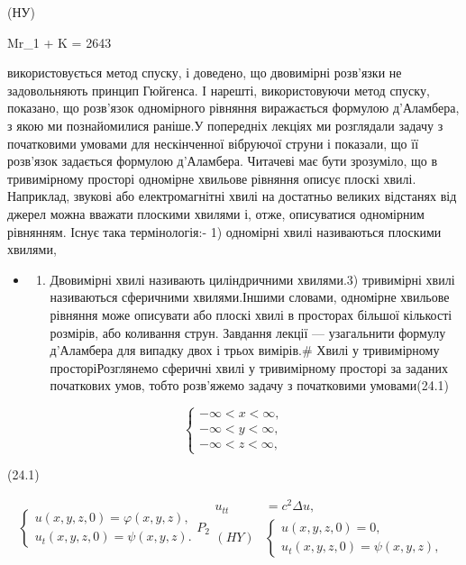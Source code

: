 \documentclass[
  ukrainian,
]{article}
\providecommand{\tightlist}{%
  \setlength{\itemsep}{0pt}\setlength{\parskip}{0pt}}
\begin{document}
(НУ)

Mr\_1 + K = 2643

використовується метод спуску, і доведено, що двовимірні розв'язки не
задовольняють принцип Гюйгенса. І нарешті, використовуючи метод спуску,
показано, що розв'язок одномірного рівняння виражається формулою
д'Аламбера, з якою ми познайомилися раніше.У попередніх лекціях ми
розглядали задачу з початковими умовами для нескінченної вібруючої
струни і показали, що її розв'язок задається формулою д'Аламбера.
Читачеві має бути зрозуміло, що в тривимірному просторі одномірне
хвильове рівняння описує плоскі хвилі. Наприклад, звукові або
електромагнітні хвилі на достатньо великих відстанях від джерел можна
вважати плоскими хвилями і, отже, описуватися одномірним рівнянням.
Існує така термінологія:- 1) одномірні хвилі називаються плоскими
хвилями,

\begin{itemize}
\tightlist
\item
  \begin{enumerate}
  \def\labelenumi{\arabic{enumi})}
  \setcounter{enumi}{1}
  \tightlist
  \item
    Двовимірні хвилі називають циліндричними хвилями.3) тривимірні хвилі
    називаються сферичними хвилями.Іншими словами, одномірне хвильове
    рівняння може описувати або плоскі хвилі в просторах більшої
    кількості розмірів, або коливання струн. Завдання лекції ---
    узагальнити формулу д'Аламбера для випадку двох і трьох вимірів.\#
    Хвилі у тривимірному просторіРозглянемо сферичні хвилі у
    тривимірному просторі за заданих початкових умов, тобто розв'яжемо
    задачу з початковими умовами(24.1)
  \end{enumerate}
\end{itemize}

\[
\begin{cases} -\infty < x < \infty, \\ -\infty < y < \infty, \\ -\infty < z < \infty, \end{cases}
\]

(24.1)

\[
\begin{cases} u(x, y, z, 0) = \varphi(x, y, z), \\ u_{t}(x, y, z, 0) = \psi(x, y, z). \end{cases}
P_{2}
\begin{aligned} u_{tt} &= c^2 \Delta u, \\ (HY) & \begin{cases} u(x, y, z, 0) = 0, \\ u_t(x, y, z, 0) = \psi(x, y, z), \end{cases} \end{aligned}
\]
\end{document}
